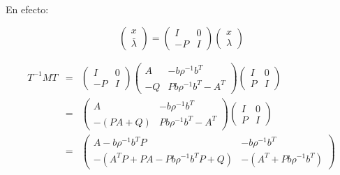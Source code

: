             En efecto:

            \begin{equation*}
                \begin{pmatrix}
                    x \\
                    \bar{\lambda}
                \end{pmatrix} =
                \begin{pmatrix}
                    I & 0 \\
                    -P & I
                \end{pmatrix}
                \begin{pmatrix}
                    x \\
                    \lambda
                \end{pmatrix}
            \end{equation*}

            \begin{eqnarray*}
                T^{-1} M T & = &
                \begin{pmatrix}
                    I & 0 \\
                    -P & I
                \end{pmatrix}
                \begin{pmatrix}
                    A & -b \rho^{-1} b^T \\
                    -Q & P b \rho^{-1} b^T - A^T
                \end{pmatrix}
                \begin{pmatrix}
                    I & 0 \\
                    P & I
                \end{pmatrix} \\
                & = &
                \begin{pmatrix}
                    A & -b \rho^{-1} b^T \\
                    -(PA + Q) & P b \rho^{-1} b^T - A^T
                \end{pmatrix}
                \begin{pmatrix}
                    I & 0 \\
                    P & I
                \end{pmatrix} \\
                & = &
                \begin{pmatrix}
                    A - b \rho^{-1} b^T P & -b \rho^{-1} b^T \\
                    -(A^TP + PA - Pb \rho^{-1} b^T P + Q) & - (A^T + P b \rho^{-1} b^T)
                \end{pmatrix}
            \end{eqnarray*}

